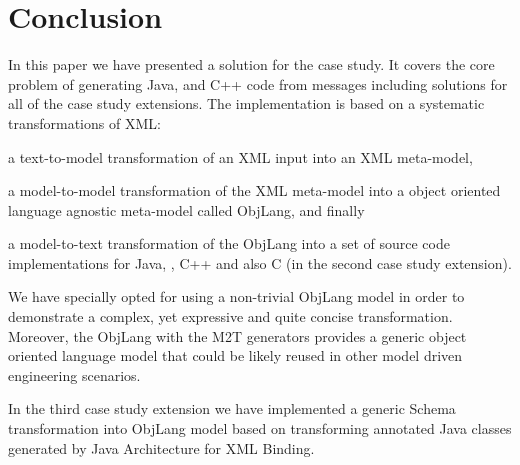 
\section{Conclusion}
\label{sec:Conclusion}

In this paper we have presented a \SIGMA solution for the \TTC \FIXML case study.
It covers the core problem of generating Java, \Csharp and C++ code from \FIXML messages including solutions for all of the case study extensions.
The implementation is based on a systematic transformations of XML:
\begin{inparaenum}[(1)]
	\item a text-to-model transformation of an XML input into an XML meta-model,
	\item a model-to-model transformation of the XML meta-model into a object oriented language agnostic meta-model called ObjLang, and finally
	\item a model-to-text transformation of the ObjLang into a set of source code implementations for Java, \Csharp, C++ and also C (in the second case study extension).
\end{inparaenum}
We have specially opted for using a non-trivial ObjLang model in order to demonstrate a complex, yet expressive and quite concise transformation.
Moreover, the ObjLang with the M2T generators provides a generic object oriented language model that could be likely reused in other model driven engineering scenarios.

In the third case study extension we have implemented a generic \FIXML Schema transformation into ObjLang model based on transforming annotated Java classes generated by Java Architecture for XML Binding.